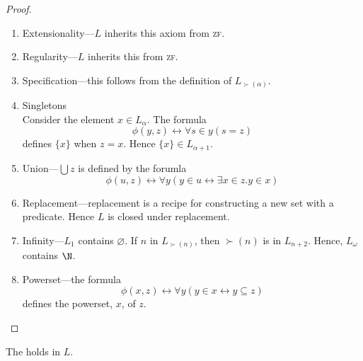 \message{ !name(truth.tex)}\documentclass{scrbook}
\renewcommand{\iff}{\leftrightarrow}
\renewcommand{\emptyset}{\varnothing}
\begin{document}
\begin{proof}
  \begin{enumerate}
  \item Extensionality---$L$ inherits this axiom from \textsc{zf}.
  \item Regularity---$L$ inherits this from \textsc{zf}. 
  \item Specification---this follows from the definition of $L_{\succ(\alpha)}$. 
  \item Singletons \\
    Consider the element $x\in L_\alpha$. The formula 
    \[
    \phi(y,z) \iff \forall s\in y (s=z)
    \]
    defines $\{x\}$ when $z=x$. Hence $\{x\}\in L_{\alpha+1}$. 
  \item Union---$\bigcup z$ is defined by the forumla
    \[
    \phi(u,z)\iff \forall y ( y\in u \iff \exists x \in z . y\in x)
    \]
  \item Replacement---replacement is a recipe for constructing a new set with a predicate. Hence $L$ is closed under replacement.
  \item Infinity---$L_1$ contains $\emptyset$. If $n$ in $L_{\succ (n)}$, then $\succ(n)$ is in $L_{n+2}$. Hence, $L_\omega$ contains $\N$. 
  \item Powerset---the formula
    \[
    \phi(x,z)\iff\forall y ( y\in x \iff y\subseteq z)
    \]
    defines the powerset, $x$, of $z$. 
  \end{enumerate}
\end{proof}
\begin{theorem}
  The  holds in $L$. 
\end{theorem}
\end{document}
